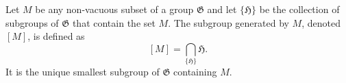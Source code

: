 Let $M$ be any non-vacuous subset of a group $\mathfrak{G}$ and let $\{\mathfrak{H}\}$ be the collection of subgroups of $\mathfrak{G}$ that contain the set $M$. The subgroup generated by $M$, denoted $[M]$, is defined as
$$[M] = \bigcap_{\{\mathfrak{H}\}} \mathfrak{H}.$$
It is the unique smallest subgroup of $\mathfrak{G}$ containing $M$.
